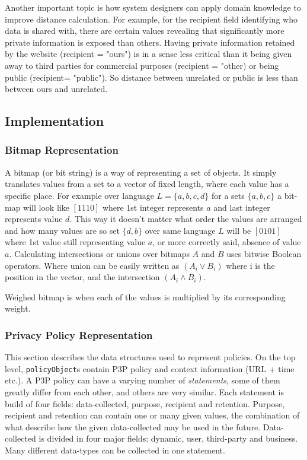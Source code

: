 Another important topic is how system designers can apply domain knowledge to improve distance calculation. For example, for the recipient field identifying who data is shared with, there are certain values revealing that significantly more private information is exposed than others. Having private information retained by the website (recipient = "ours") is in a sense less critical than it being given away to third parties for commercial purposes (recipient = "other) or being public (recipient= "public"). So distance between unrelated or public is less than between ours and unrelated.

\subsection{Implementation}

\subsubsection{Bitmap Representation}
A bitmap (or bit string) is a way of representing a set of objects. It simply translates values from a set to a vector of fixed length, where each value has a specific place. For example over language $L=\{a,b,c,d\}$ for a sets $\{a,b,c\}$ a bit-map will look like $[1 1 1 0]$ where 1st integer represents $a$ and last integer represents value $d$. This way it doesn't matter what order the values are arranged and how many values are so set $\{d,b\}$ over same language $L$ will be $[0 1 0 1]$ where 1st value still representing value $a$, or more correctly said, absence of value $a$. Calculating intersections or unions over bitmaps $A$ and $B$ uses bitwise Boolean operators. Where union can be easily written as $(A_i \vee B_i)$ where i is the position in the vector, and the intersection $(A_i \wedge B_i)$.

Weighed bitmap is when each of the values is multiplied by its corresponding weight.

\subsubsection{Privacy Policy Representation}

This section describes the data structures used to represent policies. On the top level, \texttt{policyObject}s contain P3P policy and context information (URL + time etc.). A P3P policy can have a varying number of \emph{statements}, some of them greatly differ from each other, and others are very similar. Each statement is build of four fields: data-collected, purpose, recipient and retention. Purpose, recipient and retention can contain one or many given values, the combination of what describe how the given data-collected may be used in the future. Data-collected is divided in four major fields: dynamic, user, third-party and business. Many different data-types can be collected in one statement.

